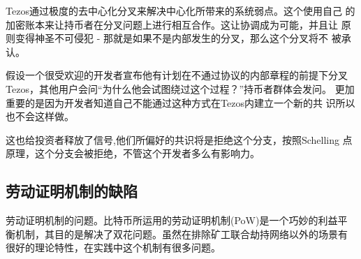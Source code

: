 \documentclass[letterpaper]{article}
\begin{document}
Tezos通过极度的去中心化分叉来解决中心化所带来的系统弱点。这个使用自己
的加密账本来让持币者在分叉问题上进行相互合作。这让协调成为可能，并且让
原则变得神圣不可侵犯 - 那就是如果不是内部发生的分叉，那么这个分叉将不
被承认。


假设一个很受欢迎的开发者宣布他有计划在不通过协议的内部章程的前提下分叉
Tezos，其他用户会问``为什么他会试图绕过这个过程？''持币者群体会发问。
更加重要的是因为开发者知道自己不能通过这种方式在Tezos内建立一个新的共
识所以也不会这样做。

这也给投资者释放了信号,他们所偏好的共识将是拒绝这个分支，按照Schelling
点原理，这个分支会被拒绝，不管这个开发者多么有影响力。

\subsection{劳动证明机制的缺陷}

劳动证明机制的问题。比特币所运用的劳动证明机制(PoW)是一个巧妙的利益平
衡机制，其目的是解决了双花问题。虽然在排除矿工联合劫持网络以外的场景有
很好的理论特性，在实践中这个机制有很多问题。

\end{document}
